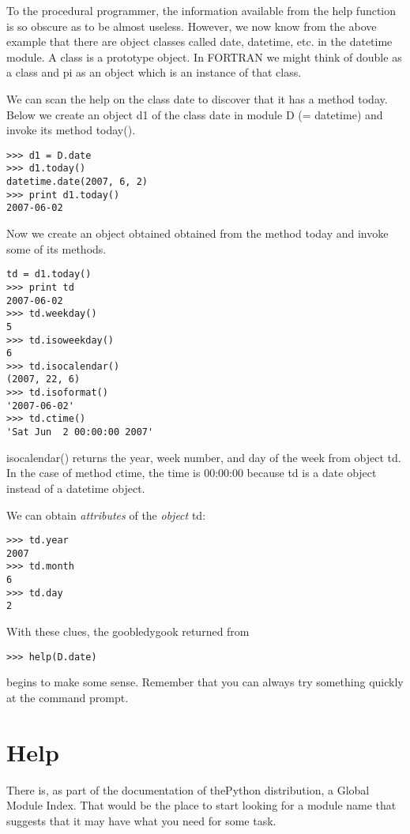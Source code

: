 \documentclass{article}
\begin{document}
To the procedural programmer, the information available from the help function
is so obscure as to be almost useless. However, we now know from the above
example
that there are object classes called {\ttfamily date}, {\ttfamily datetime},
etc. in the {\ttfamily datetime} module. 
A class is a prototype object. In FORTRAN we might think of {\ttfamily
double} as a class and {\ttfamily pi} as an object which is an instance of
that class.

We can scan the help on the class {\ttfamily date} to discover that it has a 
method {\ttfamily today}. Below we create an object {\ttfamily d1} of the
class {\ttfamily date} in module {\ttfamily D (= datetime)} and invoke its
method {\ttfamily today()}.
\begin{verbatim}
>>> d1 = D.date
>>> d1.today()
datetime.date(2007, 6, 2)
>>> print d1.today()
2007-06-02
\end{verbatim}
Now we create an object obtained obtained from the method {\ttfamily today}
and invoke some of its methods.
\begin{verbatim}
td = d1.today()
>>> print td
2007-06-02
>>> td.weekday()
5
>>> td.isoweekday()
6
>>> td.isocalendar()
(2007, 22, 6)
>>> td.isoformat()
'2007-06-02'
>>> td.ctime()
'Sat Jun  2 00:00:00 2007'
\end{verbatim}
{\ttfamily isocalendar()} returns the year, week number, and day of the week
from object {\ttfamily td}.
In the case of method {\ttfamily ctime}, the time is 00:00:00 because
{\ttfamily td} is a {\ttfamily date}
object instead of a {\ttfamily datetime} object.

We can obtain {\itshape attributes} of the {\itshape object} {\ttfamily td}:
\begin{verbatim}
>>> td.year
2007
>>> td.month
6
>>> td.day
2
\end{verbatim}
With these clues, the goobledygook returned from
\begin{verbatim}
>>> help(D.date)
\end{verbatim}
begins to make some sense.  Remember that you can always try something quickly
at the command prompt.

\section{Help}

There is, as part of the documentation of thePython distribution, a Global Module Index.
That would be the place to start looking for a module name that suggests that it may
have what you need for some task.
\end{document}
